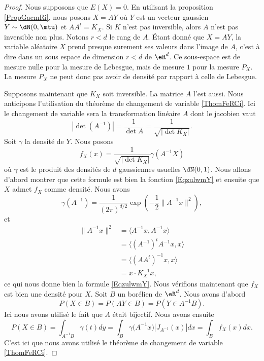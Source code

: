 \begin{proof}
    Nous supposons que \( E(X)=0\). En utilisant la proposition \ref{PropGacmRi}, nous posons \( X=AY\) où \( Y\) est un vecteur gaussien \( Y\sim\dN(0,\mtu)\) et \( AA^t=K_X\). Si \( K\) n'est pas inversible, alors \( A\) n'est pas inversible non plus. Notons \( r<d\) le rang de \( A\). Étant donné que \( X=AY\), la variable aléatoire \( X\) prend presque surement ses valeurs dans l'image de \( A\), c'est à dire dans un sous espace de dimension \( r<d\) de \( \eR^d\). Ce sous-espace est de mesure nulle pour la mesure de Lebesgue, mais de mesure \( 1\) pour la mesure \( P_X\). La mesure \( P_X\) ne peut donc pas avoir de densité par rapport à celle de Lebesgue.

    Supposons maintenant que \( K_X\) soit inversible. La matrice \( A\) l'est aussi. Nous anticipons l'utilisation du théorème de changement de variable \ref{ThomFeRCi}. Ici le changement de variable sera la transformation linéaire \( A\) dont le jacobien vaut
    \begin{equation}
        | \det(A^{-1}) |=\frac{1}{ \det A }=\frac{1}{ \sqrt{| \det K_X |} }.
    \end{equation}
    Soit \( \gamma\) la densité de \( Y\). Nous posons
    \begin{equation}
        f_X(x)=\frac{1}{\sqrt{| \det K_X |}} \gamma(A^{-1} X)
    \end{equation}
    où \( \gamma\) est le produit des densités de \( d\) gaussiennes usuelles \( \dN(0,1)\). Nous allons d'abord montrer que cette formule est bien la fonction \eqref{EqzulwmY} et ensuite que \( X\) admet \( f_X\) comme densité. Nous avons
    \begin{equation}
        \gamma(A^{-1})=\frac{1}{ (2\pi)^{d/2} }\exp\left( -\frac{ 1 }{2}\| A^{-1}x \|^2 \right),
    \end{equation}
    et 
    \begin{subequations}
        \begin{align}
            \| A^{-1}x \|^2&=\langle A^{-1}x, A^{-1}x\rangle \\
            &=\langle (A^{-1})^tA^{-1}x, x\rangle \\
            &=\langle (AA^t)^{-1}x, x\rangle \\
            &=x\cdot K_X^{-1}x,
        \end{align}
    \end{subequations}
    ce qui nous donne bien la formule \eqref{EqzulwmY}. Nous vérifions maintenant que \( f_X\) est bien une densité pour \( X\). Soit \( B\) un borélien de \( \eR^d\). Nous avons d'abord
    \begin{equation}
        P(X\in B)=P(AY\in B)=P(Y\in A^{-1}B).
    \end{equation}
    Ici nous avons utilisé le fait que \( A\) était bijectif. Nous avons ensuite
    \begin{equation}
            P(X\in B)=\int_{A^{-1}B}\gamma(t)dy
            =\int_B\gamma\big( A^{-1}x \big)| J_{A^{-1}}(x) |dx
            =\int_Bf_X(x)dx.
    \end{equation}
    C'est ici que nous avons utilisé le théorème de changement de variable \ref{ThomFeRCi}.
\end{proof}

